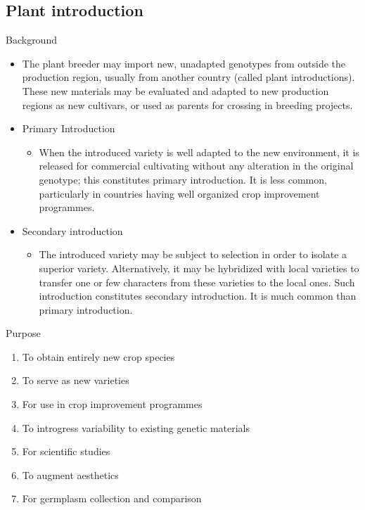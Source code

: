 \documentclass[
  ignorenonframetext,
  aspectratio=169]{beamer}
\providecommand{\tightlist}{%
  \setlength{\itemsep}{0pt}\setlength{\parskip}{0pt}}
\begin{document}
\hypertarget{plant-introduction}{%
\subsection{Plant introduction}\label{plant-introduction}}

\begin{frame}{Background}
\protect\hypertarget{background}{}
\begin{itemize}
\item
  The plant breeder may import new, unadapted genotypes from outside the
  production region, usually from another country (called plant
  introductions). These new materials may be evaluated and adapted to
  new production regions as new cultivars, or used as parents for
  crossing in breeding projects.
\item
  Primary Introduction

  \begin{itemize}
  \tightlist
  \item
    When the introduced variety is well adapted to the new environment,
    it is released for commercial cultivating without any alteration in
    the original genotype; this constitutes primary introduction. It is
    less common, particularly in countries having well organized crop
    improvement programmes.
  \end{itemize}
\item
  Secondary introduction

  \begin{itemize}
  \tightlist
  \item
    The introduced variety may be subject to selection in order to
    isolate a superior variety. Alternatively, it may be hybridized with
    local varieties to transfer one or few characters from these
    varieties to the local ones. Such introduction constitutes secondary
    introduction. It is much common than primary introduction.
  \end{itemize}
\end{itemize}
\end{frame}

\begin{frame}{Purpose}
\protect\hypertarget{purpose}{}
\begin{enumerate}
\tightlist
\item
  To obtain entirely new crop species
\item
  To serve as new varieties
\item
  For use in crop improvement programmes
\item
  To introgress variability to existing genetic materials
\item
  For scientific studies
\item
  To augment aesthetics
\item
  For germplasm collection and comparison
\end{enumerate}
\end{frame}
\end{document}
